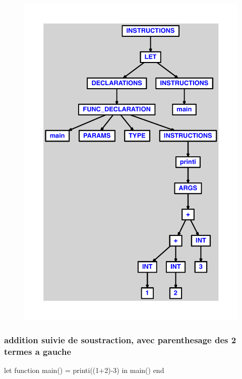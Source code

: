 \documentclass{article}
\begin{document}
\begin{figure}[H]\centering\includegraphics[max width=\textwidth]{ast/ast_95.pdf}\end{figure}\subsubsection{addition suivie de soustraction, avec parenthesage des 2 termes a gauche}
\begin{verbatimtab}
let function main() = printi((1+2)-3) in main() end
\end{verbatimtab}
\end{document}
